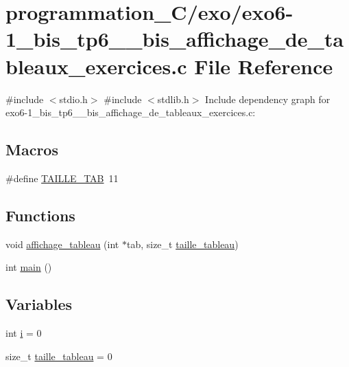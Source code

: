 \hypertarget{exo6-1__bis__tp6__1__bis__affichage__de__tableaux__exercices_8c}{}\section{programmation\+\_\+\+C/exo/exo6-\/1\+\_\+bis\+\_\+tp6\+\_\+\_\+bis\+\_\+affichage\+\_\+de\+\_\+tableaux\+\_\+exercices.c File Reference}
\label{exo6-1__bis__tp6__1__bis__affichage__de__tableaux__exercices_8c}
{\ttfamily \#include $<$stdio.\+h$>$}\newline
{\ttfamily \#include $<$stdlib.\+h$>$}\newline
Include dependency graph for exo6-\/1\+\_\+bis\+\_\+tp6\+\_\+\_\+bis\+\_\+affichage\+\_\+de\+\_\+tableaux\+\_\+exercices.c\+:
\subsection*{Macros}
\begin{DoxyCompactItemize}
\item 
\#define \hyperlink{exo6-1__bis__tp6__1__bis__affichage__de__tableaux__exercices_8c_a8e3cb9009b46b64393c55392ab1f685c}{T\+A\+I\+L\+L\+E\+\_\+\+T\+AB}~11
\end{DoxyCompactItemize}
\subsection*{Functions}
\begin{DoxyCompactItemize}
\item 
void \hyperlink{exo6-1__bis__tp6__1__bis__affichage__de__tableaux__exercices_8c_a6a4e8f86fcdca2532fbc213198e2971e}{affichage\+\_\+tableau} (int $\ast$tab, size\+\_\+t \hyperlink{fonction__affichage_8c_a09748fb1f2fd38d0fd97b52bc8fb1684}{taille\+\_\+tableau})
\item 
int \hyperlink{exo6-1__bis__tp6__1__bis__affichage__de__tableaux__exercices_8c_ae66f6b31b5ad750f1fe042a706a4e3d4}{main} ()
\end{DoxyCompactItemize}
\subsection*{Variables}
\begin{DoxyCompactItemize}
\item 
int \hyperlink{exo6-1__bis__tp6__1__bis__affichage__de__tableaux__exercices_8c_acb559820d9ca11295b4500f179ef6392}{i} = 0
\item 
size\+\_\+t \hyperlink{exo6-1__bis__tp6__1__bis__affichage__de__tableaux__exercices_8c_a09748fb1f2fd38d0fd97b52bc8fb1684}{taille\+\_\+tableau} = 0
\end{DoxyCompactItemize}


